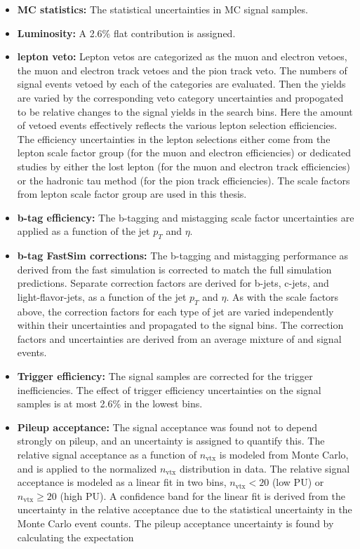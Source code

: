 \begin{itemize}
\item {\bf MC statistics:} The statistical uncertainties in MC signal samples.
\item {\bf Luminosity:} A 2.6\% flat contribution is assigned.
\item {\bf lepton veto:} Lepton vetos are categorized as the muon and electron vetoes, the muon and electron track vetoes and the pion track veto.
The numbers of signal events vetoed by each of the categories are evaluated. Then the yields are varied by the corresponding veto category uncertainties and propogated to be relative changes to the signal yields in the search bins. Here the amount of vetoed events effectively reflects the various lepton selection efficiencies.
The efficiency uncertainties in the lepton selections either come from the lepton scale factor group (for the muon and electron efficiencies) or dedicated studies by either the lost lepton (for the muon and electron track efficiencies) or the hadronic tau method (for the pion track efficiencies). The scale factors from lepton scale factor group are used in this thesis.
\item {\bf b-tag efficiency:} The b-tagging and mistagging scale factor uncertainties are applied as a function of the jet $p_{T}$ and $\eta$.
\item {\bf b-tag FastSim corrections:} The b-tagging and mistagging performance as derived from the fast simulation is corrected to match the
full simulation predictions. Separate correction factors are derived for b-jets, c-jets, and light-flavor-jets, as a function of the jet $p_{T}$ and $\eta$. As with the scale factors above, the correction factors for each type of jet are varied independently within their uncertainties and propagated to the signal bins. The correction factors and uncertainties are derived from an average mixture of \ttbar and signal events.
\item {\bf Trigger efficiency:} The signal samples are corrected for the trigger inefficiencies. The effect of trigger efficiency uncertainties on the signal samples is at most 2.6\% in the lowest \MET bins.
\item {\bf Pileup acceptance:}
The signal acceptance was found not to depend strongly on pileup, and an uncertainty is assigned to quantify this. The relative signal acceptance as a function of $n_{\text{vtx}}$ is modeled from Monte Carlo, and is applied to the normalized $n_{\text{vtx}}$ distribution in data.
The relative signal acceptance is modeled as a linear fit in two bins, $n_{\text{vtx}} < 20$ (low PU) or $n_{\text{vtx}} \geq 20$ (high PU). A confidence band for the linear fit is derived from the uncertainty in the relative acceptance due to the statistical uncertainty in the Monte Carlo event counts. The pileup acceptance uncertainty is found by calculating the expectation

\end{itemize}
